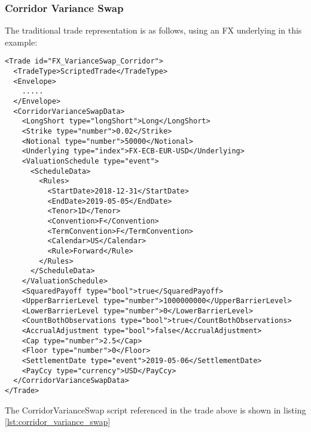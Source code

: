 \subsubsection*{Corridor Variance Swap}

The traditional trade representation is as follows, using an FX underlying in this example:

\begin{verbatim}
<Trade id="FX_VarianceSwap_Corridor">
  <TradeType>ScriptedTrade</TradeType>
  <Envelope>
    .....
  </Envelope>
  <CorridorVarianceSwapData>
    <LongShort type="longShort">Long</LongShort>
    <Strike type="number">0.02</Strike>
    <Notional type="number">50000</Notional>
    <Underlying type="index">FX-ECB-EUR-USD</Underlying>
    <ValuationSchedule type="event">
      <ScheduleData>
        <Rules>
          <StartDate>2018-12-31</StartDate>
          <EndDate>2019-05-05</EndDate>
          <Tenor>1D</Tenor>
          <Convention>F</Convention>
          <TermConvention>F</TermConvention>
          <Calendar>US</Calendar>
          <Rule>Forward</Rule>
        </Rules>
      </ScheduleData>
    </ValuationSchedule>
    <SquaredPayoff type="bool">true</SquaredPayoff>
    <UpperBarrierLevel type="number">1000000000</UpperBarrierLevel>
    <LowerBarrierLevel type="number">0</LowerBarrierLevel>
    <CountBothObservations type="bool">true</CountBothObservations>
    <AccrualAdjustment type="bool">false</AccrualAdjustment>
    <Cap type="number">2.5</Cap>
    <Floor type="number">0</Floor>
    <SettlementDate type="event">2019-05-06</SettlementDate>
    <PayCcy type="currency">USD</PayCcy>
  </CorridorVarianceSwapData>
</Trade>
\end{verbatim}

The CorridorVarianceSwap script referenced in the trade above is shown in listing
\ref{lst:corridor_variance_swap}

